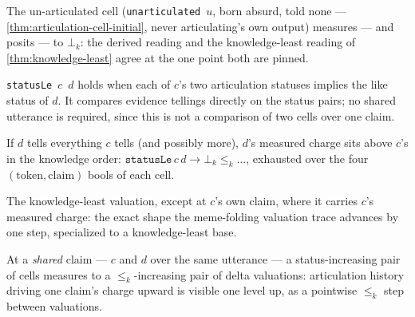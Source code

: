 \begin{theorem}\label{thm:meme-initial-charge}\leanok{}
The un-articulated cell (\texttt{unarticulated}~\(u\), born absurd, told
none --- \cref{thm:articulation-cell-initial}, never articulating's own
output) measures --- and posits --- to \(\bot_k\): the derived reading and
the knowledge-least reading of \cref{thm:knowledge-least} agree at the one
point both are pinned.
\end{theorem}

\begin{definition}\label{thm:statusle}\leanok{}
\texttt{statusLe}~\(c\)~\(d\) holds when each of \(c\)'s two articulation
statuses implies the like status of \(d\). It compares evidence tellings
directly on the status pairs; no shared utterance is required, since this is
not a comparison of two cells over one claim.
\end{definition}

\begin{theorem}\label{thm:measure-mono}\leanok{}
If \(d\) tells everything \(c\) tells (and possibly more), \(d\)'s measured
charge sits above \(c\)'s in the knowledge order: \(\texttt{statusLe}\,c\,d
\to \bot_k \le_k \dots\), exhausted over the four \((\mathrm{token},
\mathrm{claim})\) bools of each cell.
\end{theorem}

\begin{definition}\label{thm:deltavaluation}\leanok{}
The knowledge-least valuation, except at \(c\)'s own claim, where it carries
\(c\)'s measured charge: the exact shape the meme-folding valuation trace
advances by one step, specialized to a knowledge-least base.
\end{definition}

\begin{theorem}\label{thm:deltavaluation-mono}\leanok{}
At a \emph{shared} claim --- \(c\) and \(d\) over the same utterance --- a
status-increasing pair of cells measures to a \(\le_k\)-increasing pair of
delta valuations: articulation history driving one claim's charge upward is
visible one level up, as a pointwise \(\le_k\) step between valuations.
\end{theorem}

